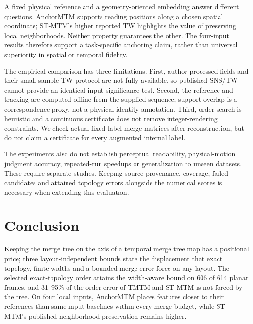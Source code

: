 \documentclass{vgtc}                %
\begin{document}
A fixed physical reference and a geometry-oriented embedding answer different questions. AnchorMTM supports reading positions along a chosen spatial coordinate; ST-MTM's higher reported TW highlights the value of preserving local neighborhoods. Neither property guarantees the other. The four-input results therefore support a task-specific anchoring claim, rather than universal superiority in spatial or temporal fidelity.

The empirical comparison has three limitations. First, author-processed fields and their small-sample TW protocol are not fully available, so published SNS/TW cannot provide an identical-input significance test. Second, the reference and tracking are computed offline from the supplied sequence; support overlap is a correspondence proxy, not a physical-identity annotation. Third, order search is heuristic and a continuous certificate does not remove integer-rendering constraints. We check actual fixed-label merge matrices after reconstruction, but do not claim a certificate for every augmented internal label.

The experiments also do not establish perceptual readability, physical-motion judgment accuracy, repeated-run speedups or generalization to unseen datasets. These require separate studies. Keeping source provenance, coverage, failed candidates and attained topology errors alongside the numerical scores is necessary when extending this evaluation.
\section{Conclusion}
Keeping the merge tree on the axis of a temporal merge tree map has a positional price; three layout-independent bounds state the displacement that exact topology, finite widths and a bounded merge error force on any layout. The selected exact-topology order attains the width-aware bound on 606 of 614 planar frames, and 31--95\% of the order error of TMTM and ST-MTM is not forced by the tree. On four local inputs, AnchorMTM places features closer to their references than same-input baselines within every merge budget, while ST-MTM's published neighborhood preservation remains higher.
\FloatBarrier
\begingroup
{}


\endgroup
\end{document}
